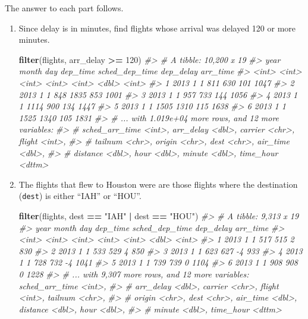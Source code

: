 \documentclass[]{book}
\newenvironment{Shaded}{\begin{snugshade}}{\end{snugshade}}
\newcommand{\CommentTok}[1]{\textcolor[rgb]{0.56,0.35,0.01}{\textit{#1}}}
\newcommand{\DecValTok}[1]{\textcolor[rgb]{0.00,0.00,0.81}{#1}}
\newcommand{\KeywordTok}[1]{\textcolor[rgb]{0.13,0.29,0.53}{\textbf{#1}}}
\newcommand{\NormalTok}[1]{#1}
\newcommand{\OperatorTok}[1]{\textcolor[rgb]{0.81,0.36,0.00}{\textbf{#1}}}
\newcommand{\StringTok}[1]{\textcolor[rgb]{0.31,0.60,0.02}{#1}}
\theoremstyle{plain}
\theoremstyle{remark}
\begin{document}
The answer to each part follows.

\begin{enumerate}
\def\labelenumi{\arabic{enumi}.}
\item
  Since delay is in minutes, find
  flights whose arrival was delayed 120 or more minutes.

\begin{Shaded}
\begin{Highlighting}[]
\KeywordTok{filter}\NormalTok{(flights, arr_delay }\OperatorTok{>=}\StringTok{ }\DecValTok{120}\NormalTok{)}
\CommentTok{#> # A tibble: 10,200 x 19}
\CommentTok{#>    year month   day dep_time sched_dep_time dep_delay arr_time}
\CommentTok{#>   <int> <int> <int>    <int>          <int>     <dbl>    <int>}
\CommentTok{#> 1  2013     1     1      811            630       101     1047}
\CommentTok{#> 2  2013     1     1      848           1835       853     1001}
\CommentTok{#> 3  2013     1     1      957            733       144     1056}
\CommentTok{#> 4  2013     1     1     1114            900       134     1447}
\CommentTok{#> 5  2013     1     1     1505           1310       115     1638}
\CommentTok{#> 6  2013     1     1     1525           1340       105     1831}
\CommentTok{#> # ... with 1.019e+04 more rows, and 12 more variables:}
\CommentTok{#> #   sched_arr_time <int>, arr_delay <dbl>, carrier <chr>, flight <int>,}
\CommentTok{#> #   tailnum <chr>, origin <chr>, dest <chr>, air_time <dbl>,}
\CommentTok{#> #   distance <dbl>, hour <dbl>, minute <dbl>, time_hour <dttm>}
\end{Highlighting}
\end{Shaded}
\item
  The flights that flew to Houston were are those flights where the
  destination (\texttt{dest}) is either ``IAH'' or ``HOU''.

\begin{Shaded}
\begin{Highlighting}[]
\KeywordTok{filter}\NormalTok{(flights, dest }\OperatorTok{==}\StringTok{ "IAH"} \OperatorTok{|}\StringTok{ }\NormalTok{dest }\OperatorTok{==}\StringTok{ "HOU"}\NormalTok{)}
\CommentTok{#> # A tibble: 9,313 x 19}
\CommentTok{#>    year month   day dep_time sched_dep_time dep_delay arr_time}
\CommentTok{#>   <int> <int> <int>    <int>          <int>     <dbl>    <int>}
\CommentTok{#> 1  2013     1     1      517            515         2      830}
\CommentTok{#> 2  2013     1     1      533            529         4      850}
\CommentTok{#> 3  2013     1     1      623            627        -4      933}
\CommentTok{#> 4  2013     1     1      728            732        -4     1041}
\CommentTok{#> 5  2013     1     1      739            739         0     1104}
\CommentTok{#> 6  2013     1     1      908            908         0     1228}
\CommentTok{#> # ... with 9,307 more rows, and 12 more variables: sched_arr_time <int>,}
\CommentTok{#> #   arr_delay <dbl>, carrier <chr>, flight <int>, tailnum <chr>,}
\CommentTok{#> #   origin <chr>, dest <chr>, air_time <dbl>, distance <dbl>, hour <dbl>,}
\CommentTok{#> #   minute <dbl>, time_hour <dttm>}
\end{Highlighting}
\end{Shaded}


\end{enumerate}
\end{document}
